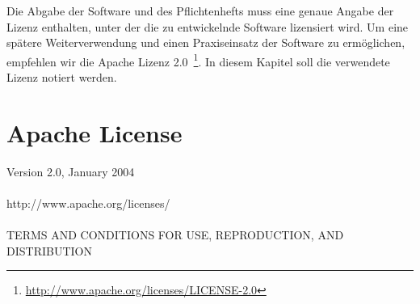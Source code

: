 \begin{tcolorbox}
Die Abgabe der Software und des Pflichtenhefts muss eine genaue Angabe der Lizenz enthalten, unter der die zu entwickelnde Software lizensiert wird.
Um eine spätere Weiterverwendung und einen Praxiseinsatz der Software zu ermöglichen, empfehlen wir die Apache Lizenz 2.0~\footnote{\url{http://www.apache.org/licenses/LICENSE-2.0}}.
In diesem Kapitel soll die verwendete Lizenz notiert werden.
\end{tcolorbox}
\section{Apache License}
Version 2.0, January 2004\\\\
http://www.apache.org/licenses/\\\\
TERMS AND CONDITIONS FOR USE, REPRODUCTION, AND DISTRIBUTION\\
